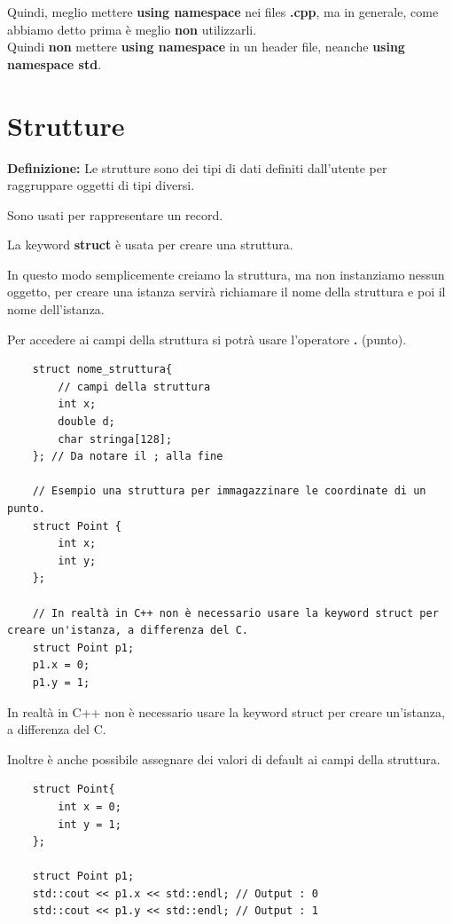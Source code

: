 \textsf{\small Quindi, meglio mettere \textbf{using namespace} nei files \textbf{.cpp}, ma in generale, come abbiamo detto prima è meglio \textbf{non} utilizzarli.} \\

\textsf{\small Quindi \textbf{non} mettere \textbf{using namespace} in un header file, neanche \textbf{using namespace std}.} \\


\newpage

\section{Strutture}

\textsf{\small \textbf{Definizione: } Le strutture sono dei tipi di dati definiti dall'utente per raggruppare oggetti di tipi diversi.} 

\textsf{\small Sono usati per rappresentare un record.}

\textsf{\small La keyword \textbf{struct} è usata per creare una struttura.}

\textsf{\small In questo modo semplicemente creiamo la struttura, ma non instanziamo nessun oggetto, per creare una istanza servirà richiamare il nome della struttura e poi il nome dell'istanza.}

\textsf{\small Per accedere ai campi della struttura si potrà usare l'operatore \textbf{.} (punto).}

\begin{lstlisting}
	struct nome_struttura{
		// campi della struttura
		int x;
		double d;
		char stringa[128];
	}; // Da notare il ; alla fine

	// Esempio una struttura per immagazzinare le coordinate di un punto.
	struct Point {
		int x;
		int y;
	};

	// In realtà in C++ non è necessario usare la keyword struct per creare un'istanza, a differenza del C.
	struct Point p1;
	p1.x = 0;
	p1.y = 1;
\end{lstlisting}

\textsf{\small In realtà in C++ non è necessario usare la keyword struct per creare un'istanza, a differenza del C.}

\textsf{\small Inoltre è anche possibile assegnare dei valori di default ai campi della struttura.} \\

\begin{lstlisting}
	struct Point{
		int x = 0;
		int y = 1;
	};

	struct Point p1;
	std::cout << p1.x << std::endl; // Output : 0
	std::cout << p1.y << std::endl; // Output : 1
\end{lstlisting}

